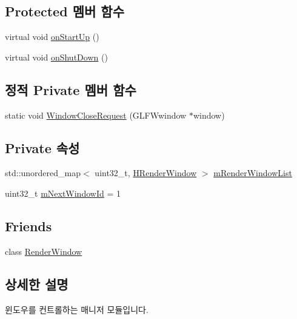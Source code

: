 \subsection*{Protected 멤버 함수}
\begin{DoxyCompactItemize}
\item 
virtual void \hyperlink{classcpf_1_1_t_module_a4eb83b0848794e422d2d345439f51a04}{on\+Start\+Up} ()
\item 
virtual void \hyperlink{classcpf_1_1_t_module_a15c93b1aca54022e145961bea8e3ea7d}{on\+Shut\+Down} ()
\end{DoxyCompactItemize}
\subsection*{정적 Private 멤버 함수}
\begin{DoxyCompactItemize}
\item 
static void \hyperlink{classcpf_1_1_render_window_manager_a3b667bdac352e584a3dc6b8132054b36}{Window\+Close\+Request} (G\+L\+F\+Wwindow $\ast$window)
\end{DoxyCompactItemize}
\subsection*{Private 속성}
\begin{DoxyCompactItemize}
\item 
std\+::unordered\+\_\+map$<$ uint32\+\_\+t, \hyperlink{namespacecpf_af5ffcc39bb6465427fc3b91366c917f6}{H\+Render\+Window} $>$ \hyperlink{classcpf_1_1_render_window_manager_a06f8628fd71091311dd2cbb908f744a2}{m\+Render\+Window\+List}
\item 
uint32\+\_\+t \hyperlink{classcpf_1_1_render_window_manager_a9066e525180a325989d0f4f97524d6f6}{m\+Next\+Window\+Id} = 1
\end{DoxyCompactItemize}
\subsection*{Friends}
\begin{DoxyCompactItemize}
\item 
class \hyperlink{classcpf_1_1_render_window_manager_a6752354900753e609e76d5e224630518}{Render\+Window}
\end{DoxyCompactItemize}


\subsection{상세한 설명}
윈도우를 컨트롤하는 매니저 모듈입니다. 

